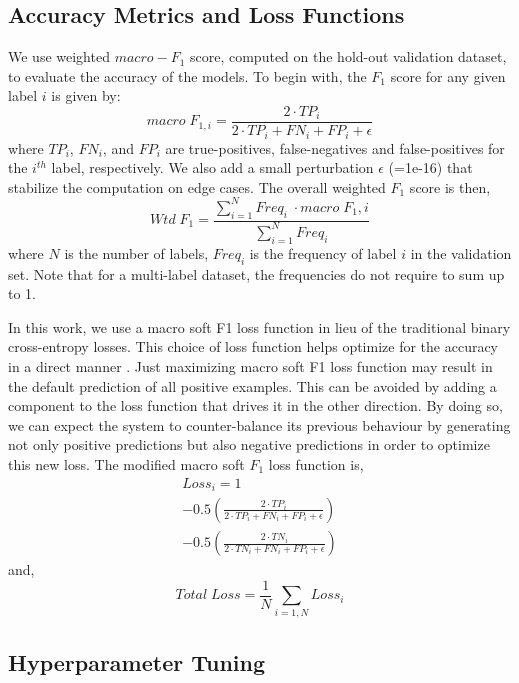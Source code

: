 \documentclass[10pt]{article}
\begin{document}
\subsection{Accuracy Metrics and Loss Functions}
We use weighted $macro-F_1$ score, computed on the hold-out validation dataset, to evaluate the accuracy of the models. To begin with, the $F_1$ score for any given label $i$ is given by:
\begin{equation}
    macro\;F_{1,i} = \frac{2\cdot TP_i}{2\cdot TP_i + FN_i + FP_i + \epsilon}
\end{equation}
where $TP_i$, $FN_i$, and $FP_i$ are true-positives, false-negatives and false-positives for the $i^{th}$ label, respectively. We also add a small perturbation $\epsilon$ (=1e-16) that stabilize the computation on edge cases. The overall weighted $F_1$ score is then,
\begin{equation}
    Wtd\;F_1 = \frac{\sum_{i=1}^{N} Freq_i\;  \cdot macro\;{F_1,i}}{\sum_{i=1}^{N} Freq_i}
\end{equation}
where $N$ is the number of labels, $Freq_i$ is the frequency of label $i$ in the validation set. Note that for a multi-label dataset, the frequencies do not require to sum up to 1.

In this work, we use a macro soft F1 loss function in lieu of the traditional binary cross-entropy losses. This choice of loss function helps optimize for the accuracy in a direct manner \cite{lipton2014thresholding}. Just maximizing macro soft F1 loss function may result in the default prediction of all positive examples. This can be avoided by adding a component to the loss function that drives it in the other direction. By doing so, we can expect the system to counter-balance its previous behaviour by generating not only positive predictions but also negative predictions in order to optimize this new loss. The modified macro soft $F_1$ loss function is,
\begin{multline}
    Loss_i = 1 \\
         - 0.5 \left(\frac{2\cdot TP_i}{2\cdot TP_i + FN_i + FP_i + \epsilon}\right) \\
         - 0.5 \left(\frac{2\cdot TN_i}{2\cdot TN_i + FN_i + FP_i + \epsilon}\right) 
\end{multline}
and,
\begin{equation}
    Total\;Loss = \frac{1}{N}\sum_{i=1,N} Loss_i
\end{equation}

\subsection{Hyperparameter Tuning}
\end{document}
